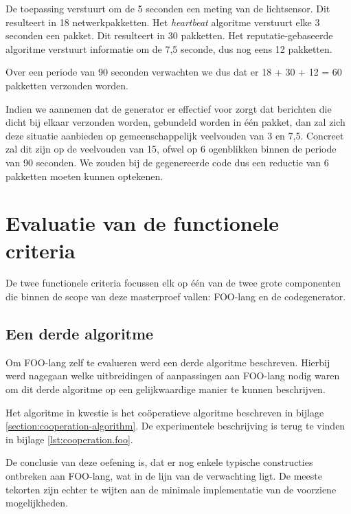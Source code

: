 De toepassing verstuurt om de 5 seconden een meting van de lichtsensor. Dit
resulteert in 18 netwerkpakketten. Het \emph{heartbeat} algoritme verstuurt
elke 3 seconden een pakket. Dit resulteert in 30 pakketten. Het
reputatie-gebaseerde algoritme verstuurt informatie om de 7,5 seconde, dus nog
eens 12 pakketten.

Over een periode van 90 seconden verwachten we dus dat er 18 + 30 + 12 = 60
pakketten verzonden worden.

Indien we aannemen dat de generator er effectief voor zorgt dat berichten die
dicht bij elkaar verzonden worden, gebundeld worden in \'e\'en pakket, dan zal
zich deze situatie aanbieden op gemeenschappelijk veelvouden van 3 en 7,5.
Concreet zal dit zijn op de veelvouden van 15, ofwel op 6 ogenblikken binnen de
periode van 90 seconden. We zouden bij de gegenereerde code dus een reductie
van 6 pakketten moeten kunnen optekenen.

\vspace{-3mm}

\section{Evaluatie van de functionele criteria}
\label{section:evaluation-functionals}

De twee functionele criteria focussen elk op \'e\'en van de twee grote
componenten die binnen de scope van deze masterproef vallen: FOO-lang en de
codegenerator.

\vspace{-3mm}

\subsection{Een derde algoritme}

Om FOO-lang zelf te evalueren werd een derde algoritme beschreven. Hierbij werd
nagegaan welke uitbreidingen of aanpassingen aan FOO-lang nodig waren om dit
derde algoritme op een gelijkwaardige manier te kunnen beschrijven.

Het algoritme in kwestie is het co\"operatieve algoritme beschreven in bijlage
\ref{section:cooperation-algorithm}. De experimentele beschrijving is terug te
vinden in bijlage \ref{lst:cooperation.foo}.

De conclusie van deze oefening is, dat er nog enkele typische constructies
ontbreken aan FOO-lang, wat in de lijn van de verwachting ligt. De meeste
tekorten zijn echter te wijten aan de minimale implementatie van de voorziene
mogelijkheden.

